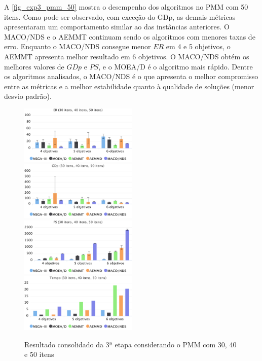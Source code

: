 A \autoref{fig_exp3_pmm_50} mostra o desempenho dos algoritmos no PMM com 50 itens. Como pode ser observado, com exceção do GDp, as demais métricas apresentaram um comportamento similar ao das instâncias anteriores. O MACO/NDS e o AEMMT continuam sendo os algoritmos com menores taxas de erro. Enquanto o MACO/NDS consegue menor $ER$ em 4 e 5 objetivos, o AEMMT apresenta melhor resultado em 6 objetivos. O MACO/NDS obtém os melhores valores de $GDp$ e $PS$, e o MOEA/D é o algoritmo mais rápido. Dentre os algoritmos analisados, o MACO/NDS é o que apresenta o melhor compromisso entre as métricas e a melhor estabilidade quanto à qualidade de soluções (menor desvio padrão).

\begin{figure}[!htbp]
	\includegraphics[width=0.5\textwidth]{cap_experimentos/figs/etapa3/er-mkp-todos}
	\includegraphics[width=0.5\textwidth]{cap_experimentos/figs/etapa3/gd-mkp-todos}
	\includegraphics[width=0.5\textwidth]{cap_experimentos/figs/etapa3/ps-mkp-todos}
	\includegraphics[width=0.5\textwidth]{cap_experimentos/figs/etapa3/time-mkp-todos}
	\caption{\label{fig_exp3_pmm_todos}Resultado consolidado da 3ª etapa considerando o PMM com 30, 40 e 50 itens}
\end{figure}

